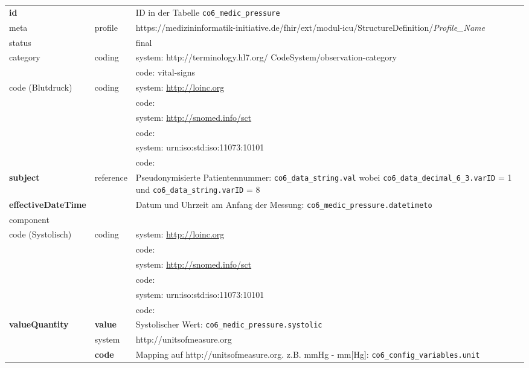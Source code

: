 \begin{longtable}{|l|l|p{7cm}|} 
	\hline
	\rowcolor{lightgray} \multicolumn{3}{|l|}{Data Mapping (inhaltlich) - Blutdruckmessungen} \\ \hline
	\textbf{id} &  & ID in der Tabelle \texttt{co6\_medic\_pressure}  \\ \hline
	meta & profile & https://medizininformatik-initiative.de/fhir/ext/modul-icu/StructureDefinition/\textsl{Profile\_Name} \\ \hline 
	status &  & final  \\ \hline 
	category & coding & system: http://terminology.hl7.org/ CodeSystem/observation-category \\ 
	\cline{3-3}
	& & code: vital-signs \\ \hline
	code (Blutdruck) & coding & system: \url{http://loinc.org} \\ 
	\cline{3-3} 
	&  & code:  \\ 
	\cline{3-3} 
	&  & system: \url{http://snomed.info/sct} \\ 
	\cline{3-3}
	&  & code:  \\ 
	\cline{3-3} 
	&  & system: urn:iso:std:iso:11073:10101 \\ 
	\cline{3-3}
	&  & code:  \\ \hline
	\textbf{subject} & reference & Pseudonymisierte Patientennummer: \texttt{co6\_data\_string.val} wobei \texttt{co6\_data\_decimal\_6\_3.varID} = 1 und \texttt{co6\_data\_string.varID} = 8 \\ \hline
	\textbf{effectiveDateTime} & & Datum und Uhrzeit am Anfang der Messung:  \texttt{co6\_medic\_pressure.datetimeto} \\ \hline
	\multicolumn{3}{|l|}{component} \\ \hline
	code (Systolisch) & coding & system: \url{http://loinc.org} \\ 
	\cline{3-3} 
	&  & code:  \\ 
	\cline{3-3} 
	&  & system: \url{http://snomed.info/sct} \\ 
	\cline{3-3}
	&  & code:  \\ 
	\cline{3-3} 
	&  & system: urn:iso:std:iso:11073:10101 \\ 
	\cline{3-3}
	&  & code:  \\ \hline	
	\textbf{valueQuantity} & \textbf{value} & Systolischer Wert: \texttt{co6\_medic\_pressure.systolic} \\
	\cline{2-3}
	& system & http://unitsofmeasure.org \\ 
	\cline{2-3}
	& \textbf{code} & Mapping auf http://unitsofmeasure.org. z.B. mmHg - mm[Hg]: \texttt{co6\_config\_variables.unit} \\ \hline

\end{longtable}

